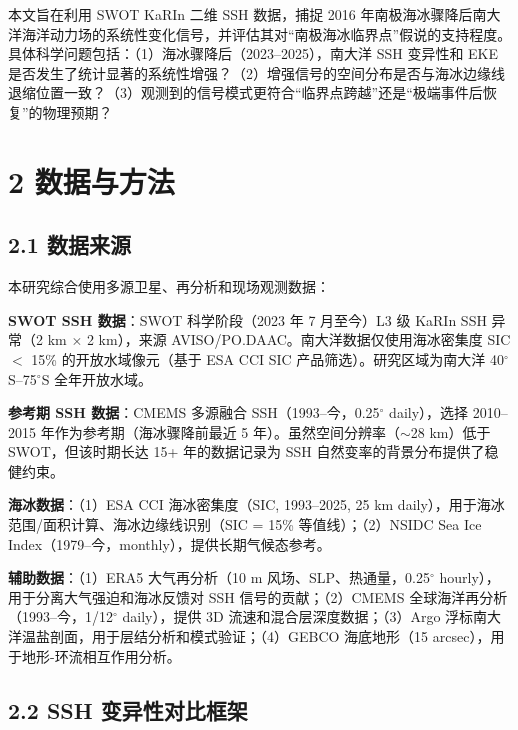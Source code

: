 \documentclass[11pt,a4paper]{article}
\begin{document}
本文旨在利用 SWOT KaRIn 二维 SSH 数据，捕捉 2016 年南极海冰骤降后南大洋海洋动力场的系统性变化信号，并评估其对``南极海冰临界点''假说的支持程度。具体科学问题包括：（1）海冰骤降后（2023--2025），南大洋 SSH 变异性和 EKE 是否发生了统计显著的系统性增强？（2）增强信号的空间分布是否与海冰边缘线退缩位置一致？（3）观测到的信号模式更符合``临界点跨越''还是``极端事件后恢复''的物理预期？\par

\section*{2  数据与方法}

\subsection*{2.1  数据来源}

本研究综合使用多源卫星、再分析和现场观测数据：

\textbf{SWOT SSH 数据}：SWOT 科学阶段（2023 年 7 月至今）L3 级 KaRIn SSH 异常（2 km $\times$ 2 km），来源 AVISO/PO.DAAC。南大洋数据仅使用海冰密集度 SIC $<$ 15\% 的开放水域像元（基于 ESA CCI SIC 产品筛选）。研究区域为南大洋 40$^\circ$S--75$^\circ$S 全年开放水域。\par

\textbf{参考期 SSH 数据}：CMEMS 多源融合 SSH（1993--今，0.25$^\circ$ daily），选择 2010--2015 年作为参考期（海冰骤降前最近 5 年）。虽然空间分辨率（$\sim$28 km）低于 SWOT，但该时期长达 15+ 年的数据记录为 SSH 自然变率的背景分布提供了稳健约束。\par

\textbf{海冰数据}：（1）ESA CCI 海冰密集度（SIC, 1993--2025, 25 km daily），用于海冰范围/面积计算、海冰边缘线识别（SIC = 15\% 等值线）；（2）NSIDC Sea Ice Index（1979--今，monthly），提供长期气候态参考。\par

\textbf{辅助数据}：（1）ERA5 大气再分析（10 m 风场、SLP、热通量，0.25$^\circ$ hourly），用于分离大气强迫和海冰反馈对 SSH 信号的贡献；（2）CMEMS 全球海洋再分析（1993--今，1/12$^\circ$ daily），提供 3D 流速和混合层深度数据；（3）Argo 浮标南大洋温盐剖面，用于层结分析和模式验证；（4）GEBCO 海底地形（15 arcsec），用于地形-环流相互作用分析。\par

\subsection*{2.2  SSH 变异性对比框架}
\end{document}
